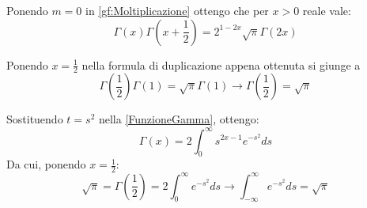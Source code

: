 \begin{corollary} \label{Duplicazione}
	Ponendo $m=0$ in \cref{gf:Moltiplicazione} ottengo che per $x>0$ reale vale:
	\begin{equation*}
		\Gamma(x)\Gamma\left(x+\frac12\right)=2^{1-2x}\sqrt{\pi}\Gamma(2x)
	\end{equation*}
\end{corollary}

\begin{remark}
	Ponendo $x=\frac12$ nella formula di duplicazione appena ottenuta si giunge a 
	\begin{equation*}
		\Gamma\left(\frac12\right)\Gamma(1)=\sqrt{\pi}\Gamma(1) \to \Gamma\left(\frac12\right)=\sqrt{\pi}
	\end{equation*}
\end{remark}

\begin{remark} \label{GaussIntegral}
	Sostituendo $t=s^2$ nella \cref{FunzioneGamma}, ottengo:
	\begin{equation}
		\Gamma(x)=2\int_0^{\infty}{s^{2x-1}e^{-s^2}ds}
	\end{equation}
	Da cui, ponendo $x=\frac{1}{2}$:
	\begin{equation*}
		\sqrt{\pi}=\Gamma\left(\frac{1}{2}\right)=2\int_0^{\infty}{e^{-s^2}ds}\to \int_{-\infty}^{\infty}{e^{-s^2}ds}=\sqrt{\pi}
	\end{equation*}
\end{remark}



